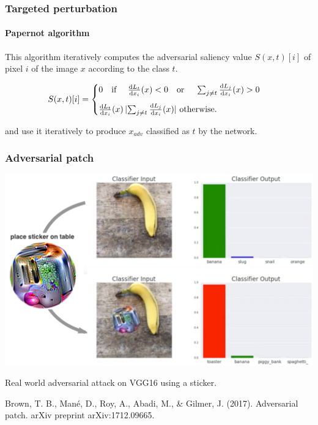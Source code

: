 \documentclass[9pt]{beamer}
\begin{document}
\appendix

\begin{frame}
  \frametitle{Targeted perturbation}

  \framesubtitle{Papernot algorithm}

  This algorithm iteratively computes the adversarial saliency value
  $S(x, t)[i]$ of pixel $i$ of the image $x$ according to the class
  $t$.

  \medskip

  \[
  S(x, t)[i] =
  \begin{cases}
    0 \text{\quad if \quad} \frac{\mathrm{d} L_{t}}{\mathrm{d} x_{i}}(x) < 0
    \text{\quad or \quad} \sum_{j \neq t} \frac{\mathrm{d} L_{j}}{\mathrm{d} x_{i}}(x)
    > 0 \\[0.3cm]
    \frac{\mathrm{d} L_{t}}{\mathrm{d} x_{i}}(x) \, \lvert \sum_{j \neq
      t} \frac{\mathrm{d} L_{j}}{\mathrm{d} x_{i}}(x) \rvert \text{ otherwise.}
  \end{cases}
  \]

  \medskip

  and use it iteratively to produce $x_{adv}$ classified as $t$ by the
  network.

\end{frame}

\begin{frame}
  \frametitle{Adversarial patch}

  \begin{center}
    \includegraphics[width = 0.8\linewidth]{images/adversarial_patch.png}
  \end{center}

  \medskip

  Real world adversarial attack on VGG16 using a sticker.

  \medskip

  {\scriptsize Brown, T. B., Mané, D., Roy, A., Abadi, M., \& Gilmer,
    J. (2017). Adversarial patch. arXiv preprint arXiv:1712.09665.}
\end{frame}
\end{document}
